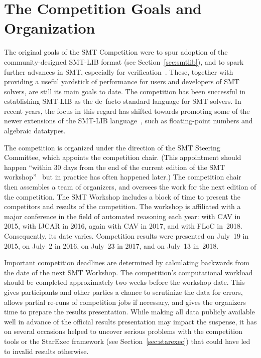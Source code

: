 \documentclass[dvipsnames,table,twoside,11pt]{article}
\begin{document}

\section{The Competition Goals and Organization}
\label{sec:goals}

The original goals of the SMT Competition were to spur adoption of the
community-designed SMT-LIB format (see Section~\ref{sec:smtlib}), and
to spark further advances in SMT, especially for
verification~\cite{BdMS05}.  These, together with providing a useful
yardstick of performance for users and developers of SMT solvers, are
still its main goals to date.  The competition has been successful in
establishing SMT-LIB as the de~facto standard language for SMT
solvers.  In recent years, the focus in this regard has shifted
towards promoting some of the newer extensions of the SMT-LIB
language~\cite{BarFT-RR-17}, such as floating-point numbers and
algebraic datatypes.

The competition is organized under the direction of the SMT Steering
Committee, which appoints the competition chair.  (This appointment
should happen ``within 30 days from the end of the current edition of
the SMT workshop''~\cite{smt-bylaws} but in practice has often
happened later.)  The competition chair then assembles a team of
organizers, and oversees the work for the next edition of the
competition.
%
The SMT Workshop includes a block of time to present the competitors
and results of the competition.  The workshop is affiliated with a
major conference in the field of automated reasoning each year: with
CAV in 2015, with IJCAR in 2016, again with CAV in 2017, and with FLoC
in~2018.  Consequently, its date varies.  Competition results were
presented on July~19 in 2015, on July~2 in 2016, on July~23 in 2017,
and on July~13 in~2018.

Important competition deadlines are determined by calculating
backwards from the date of the next SMT Workshop.  The competition's
computational workload should be completed approximately two weeks
before the workshop date.  This gives participants and other parties a
chance to scrutinize the data for errors, allows partial re-runs of
competition jobs if necessary, and gives the organizers time to
prepare the results presentation.  While making all data publicly
available well in advance of the official results presentation may
impact the suspense, it has on several occasions helped to uncover
serious problems with the competition tools or the StarExec framework
(see Section~\ref{sec:starexec}) that could have led to invalid
results otherwise.
\end{document}
